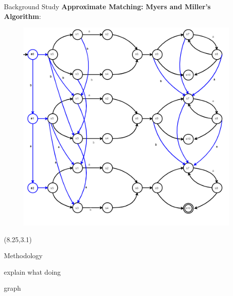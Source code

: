 \documentclass[22pt]{beamer}
\begin{document}
\begin{frame}[fragile]
\begin{textblock}{7.25}
\begin{block}{Background Study}
\textbf{Approximate Matching: Myers and Miller's Algorithm}:


\begin{figure}
\includegraphics[scale=2]{MillerAndMyersAlgorithm.PNG} 
\hspace*{.2in}
\end{figure}

\end{block}
\end{textblock}


\begin{textblock}{7.25}(8.25,3.1)
\begin{block}{Methodology}

explain what doing

graph

\end{block}



\end{textblock}
\end{frame}
\end{document}
